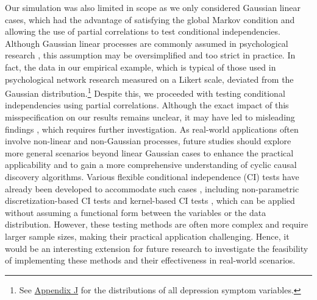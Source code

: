 \documentclass[twoside, 11pt]{article}
\begin{document}
Our simulation was also limited in scope as we only considered Gaussian linear cases, which had the advantage of satisfying the global Markov condition and allowing the use of partial correlations to test conditional independencies. Although Gaussian linear processes are commonly assumed in psychological research \citep{pek_how_2018, beller_differential_2013}, this assumption may be oversimplified and too strict in practice. In fact, the data in our empirical example, which is typical of those used in psychological network research measured on a Likert scale, deviated from the Gaussian distribution.\footnote{See \hyperref[emp-dist]{Appendix J} for the distributions of all depression symptom variables.} Despite this, we proceeded with testing conditional independencies using partial correlations. Although the exact impact of this misspecification on our results remains unclear, it may have led to misleading findings \citep{baba_partial_2004}, which requires further investigation.
As real-world applications often involve non-linear and non-Gaussian processes, future studies should explore more general scenarios beyond linear Gaussian cases to enhance the practical applicability and to gain a more comprehensive understanding of cyclic causal discovery algorithms.
Various flexible conditional independence (CI) tests have already been developed to accommodate such cases \citep{li_fan2020, canonne_testing_2018}, including non-parametric discretization-based CI tests \citep{huang_testing_2010} and kernel-based CI tests \citep{zhang_kernel-based_2012}, which can be applied without assuming a functional form between the variables or the data distribution. 
However, these testing methods are often more complex and require larger sample sizes, making their practical application challenging. Hence, it would be an interesting extension for future research to investigate the feasibility of implementing these methods and their effectiveness in real-world scenarios.
\end{document}
